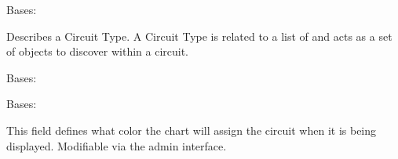 \documentclass[letterpaper,10pt,english]{sphinxmanual}
\begin{document}

\begin{fulllineitems}
\label{modules/microdata:microdata.models.CircuitType}
Bases: 

Describes a Circuit Type. A Circuit Type is related to a list of {\hyperref[modules/microdata:microdata.models.Appliance]{\emph{}}} and acts as a set of objects to discover within a circuit.

\begin{fulllineitems}
\label{modules/microdata:microdata.models.CircuitType.DoesNotExist}
Bases: 

\end{fulllineitems}


\begin{fulllineitems}
\label{modules/microdata:microdata.models.CircuitType.MultipleObjectsReturned}
Bases: 

\end{fulllineitems}


\begin{fulllineitems}
\label{modules/microdata:microdata.models.CircuitType.appliances}
\end{fulllineitems}


\begin{fulllineitems}
\label{modules/microdata:microdata.models.CircuitType.chart_color}
This field defines what color the chart will assign the circuit when it is being displayed. Modifiable via the admin interface.

\end{fulllineitems}


\end{fulllineitems}
\end{document}
